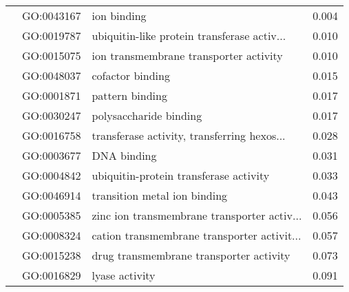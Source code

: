 \begin{longtable}{lllr}
   & GO:0043167 &                                  ion binding &         0.004 \\
   & GO:0019787 &  ubiquitin-like protein transferase activ... &         0.010 \\
   & GO:0015075 &       ion transmembrane transporter activity &         0.010 \\
   & GO:0048037 &                             cofactor binding &         0.015 \\
   & GO:0001871 &                              pattern binding &         0.017 \\
   & GO:0030247 &                       polysaccharide binding &         0.017 \\
   & GO:0016758 &  transferase activity, transferring hexos... &         0.028 \\
   & GO:0003677 &                                  DNA binding &         0.031 \\
   & GO:0004842 &       ubiquitin-protein transferase activity &         0.033 \\
   & GO:0046914 &                 transition metal ion binding &         0.043 \\
   & GO:0005385 &  zinc ion transmembrane transporter activ... &         0.056 \\
   & GO:0008324 &  cation transmembrane transporter activit... &         0.057 \\
   & GO:0015238 &      drug transmembrane transporter activity &         0.073 \\
   & GO:0016829 &                               lyase activity &         0.091 \\
\end{longtable}

